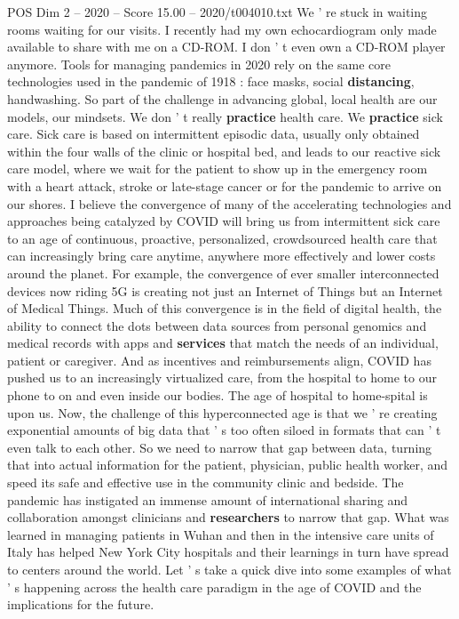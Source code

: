\begin{textsample}{POS Dim 2 – 2020 – Score 15.00 – 2020/t004010.txt}
We ' re stuck in waiting rooms waiting for our visits.
I recently had my own echocardiogram only made available to share with me on a CD-ROM.
I don ' t even own a CD-ROM player anymore.
Tools for managing pandemics in 2020 rely on the same core technologies used in the pandemic of 1918 : face masks, social \textbf{distancing}, handwashing.
So part of the challenge in advancing global, local health are our models, our mindsets.
We don ' t really \textbf{practice} health care.
We \textbf{practice} sick care.
Sick care is based on intermittent episodic data, usually only obtained within the four walls of the clinic or hospital bed, and leads to our reactive sick care model, where we wait for the patient to show up in the emergency room with a heart attack, stroke or late-stage cancer or for the pandemic to arrive on our shores.
I believe the convergence of many of the accelerating technologies and approaches being catalyzed by COVID will bring us from intermittent sick care to an age of continuous, proactive, personalized, crowdsourced health care that can increasingly bring care anytime, anywhere more effectively and lower costs around the planet.
For example, the convergence of ever smaller interconnected devices now riding 5G is creating not just an Internet of Things but an Internet of Medical Things.
Much of this convergence is in the field of digital health, the ability to connect the dots between data sources from personal genomics and medical records with apps and \textbf{services} that match the needs of an individual, patient or caregiver.
And as incentives and reimbursements align, COVID has pushed us to an increasingly virtualized care, from the hospital to home to our phone to on and even inside our bodies.
The age of hospital to home-spital is upon us.
Now, the challenge of this hyperconnected age is that we ' re creating exponential amounts of big data that ' s too often siloed in formats that can ' t even talk to each other.
So we need to narrow that gap between data, turning that into actual information for the patient, physician, public health worker, and speed its safe and effective use in the community clinic and bedside.
The pandemic has instigated an immense amount of international sharing and collaboration amongst clinicians and \textbf{researchers} to narrow that gap.
What was learned in managing patients in Wuhan and then in the intensive care units of Italy has helped New York City hospitals and their learnings in turn have spread to centers around the world.
Let ' s take a quick dive into some examples of what ' s happening across the health care paradigm in the age of COVID and the implications for the future.

\end{textsample}

